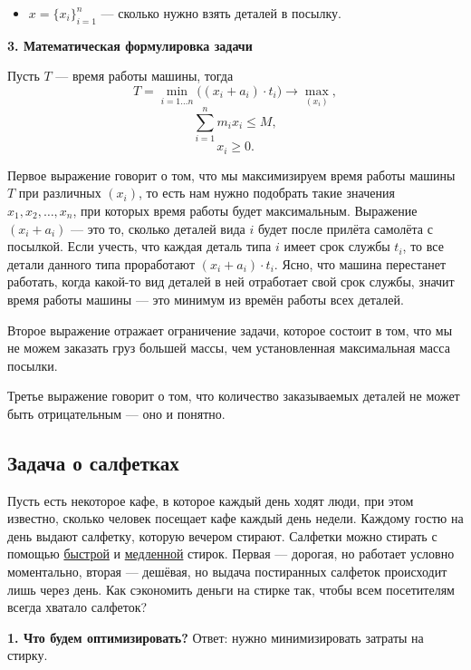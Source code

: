 \begin{itemize}[nosep]	
	\item $x = \{x_i\}_{i=1}^n$ --- сколько нужно взять деталей в посылку.
\end{itemize}

\bigskip

\textbf{3. Математическая формулировка задачи}

Пусть $T$ --- время работы машины, тогда
\[T = \min_{i = 1 \dots n} \big((x_i + a_i) \cdot t_i\big) \to \max_{(x_i)},\]
\[\sum_{i=1}^{n} m_i x_i \le M,\]
\[x_i \ge 0.\]

Первое выражение говорит о том, что мы максимизируем время работы машины $T$ при различных $(x_i)$, то есть нам нужно подобрать такие значения $x_1, x_2, \dots, x_n$, при которых время работы будет максимальным. Выражение $(x_i + a_i)$ --- это то, сколько деталей вида $i$ будет после прилёта самолёта с посылкой. Если учесть, что каждая деталь типа $i$ имеет срок службы $t_i$, то все детали данного типа проработают $(x_i + a_i) \cdot t_i$. Ясно, что машина перестанет работать, когда какой-то вид деталей в ней отработает свой срок службы, значит время работы машины --- это минимум из времён работы всех деталей.

Второе выражение отражает ограничение задачи, которое состоит в том, что мы не можем заказать груз большей массы, чем установленная максимальная масса посылки.

Третье выражение говорит о том, что количество заказываемых деталей не может быть отрицательным --- оно и понятно.

\subsection{Задача о салфетках}

\problem\label{pr:napkins}

Пусть есть некоторое кафе, в которое каждый день ходят люди, при этом известно, сколько человек посещает кафе каждый день недели. Каждому гостю на день выдают салфетку, которую вечером стирают. Салфетки можно стирать с помощью \underline{быстрой} и \underline{медленной} стирок. Первая --- дорогая, но работает условно моментально, вторая --- дешёвая, но выдача постиранных салфеток происходит лишь через день. Как сэкономить деньги на стирке так, чтобы всем посетителям всегда хватало салфеток?

\bigskip

\textbf{1. Что будем оптимизировать?} Ответ: нужно минимизировать затраты на стирку.

